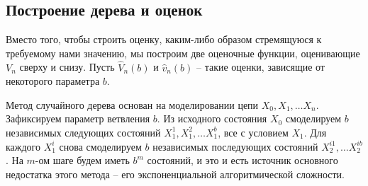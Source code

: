 \documentclass[12pt,twoside,titlepage,сa4paper]{article}
\begin{document}
	\subsection{Построение дерева и оценок}
	\par Вместо того, чтобы строить оценку, каким-либо образом стремящуюся к требуемому нами значению, мы построим две оценочные функции, оценивающие $V_n$ сверху и снизу. Пусть $\hat{V}_n\left(b\right)$ и $\hat{v}_n\left(b\right)$ -- такие оценки, зависящие от некоторого параметра $b$.
	\par Метод случайного дерева основан на моделировании цепи $X_0, X_1, \ldots X_n$. Зафиксируем параметр ветвления $b$. Из исходного состояния $X_0$ смоделируем $b$ независимых следующих состояний $X_1^1, X_1^2, \ldots X_1^b$, все с условием $X_1$. Для каждого $X_1^i$ снова смоделируем $b$ независимых последующих состояний $X_2^{i1}, \ldots X_2^{ib}$. На $m$-ом шаге будем иметь $b^m$ состояний, и это и есть источник основного недостатка этого метода -- его экспоненциальной алгоритмической сложности.
\end{document}
